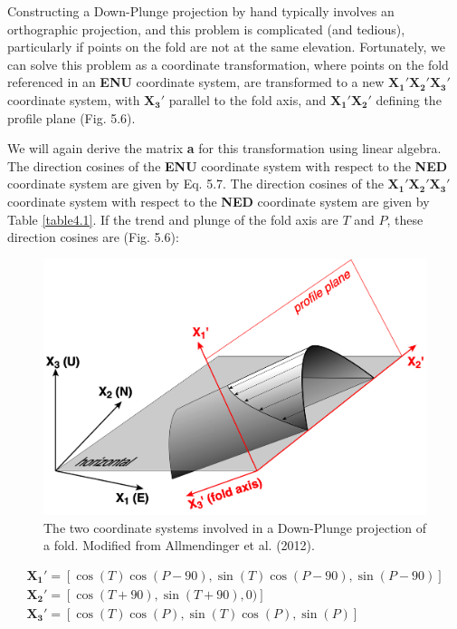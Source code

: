 \documentclass[a4paper , 12pt]{book}
\begin{document}
Constructing a Down-Plunge projection by hand typically involves an orthographic projection, and this problem is complicated (and tedious), particularly if points on the fold are not at the same elevation. Fortunately, we can solve this problem as a coordinate transformation, where points on the fold referenced in an \textbf{ENU} coordinate system, are transformed to a new $\mathbf{X_1\text{$'$}}\mathbf{X_2\text{$'$}}\mathbf{X_3\text{$'$}}$ coordinate system, with $\mathbf{X_3\text{$'$}}$ parallel to the fold axis, and $\mathbf{X_1\text{$'$}}\mathbf{X_2\text{$'$}}$ defining the profile plane (Fig. 5.6).

We will again derive the matrix \textbf{a} for this transformation using linear algebra. The direction cosines of the \textbf{ENU} coordinate system with respect to the \textbf{NED} coordinate system are given by Eq. 5.7. The direction cosines of the $\mathbf{X_1\text{$'$}}\mathbf{X_2\text{$'$}}\mathbf{X_3\text{$'$}}$ coordinate system with respect to the \textbf{NED} coordinate system are given by Table \ref{table4.1}. If the trend and plunge of the fold axis are $T$ and $P$, these direction cosines are (Fig. 5.6):

\begin{figure}[ht]
    \centering
    \includegraphics[width=12cm]{Figures/ch5f7.png}
    \caption{The two coordinate systems involved in a Down-Plunge projection of a fold. Modified from Allmendinger et al. (2012).}
\end{figure}

\begin{gather*}
    \mathbf{X_1\text{$'$}} = [\cos(T)\cos(P-90),\sin(T)\cos(P-90),\sin(P-90)] \\
    \mathbf{X_2\text{$'$}} = [\cos(T+90),\sin(T+90),0)] \\
    \mathbf{X_3\text{$'$}} = [\cos(T)\cos(P),\sin(T)\cos(P),\sin(P)]
\end{gather*}
\end{document}
